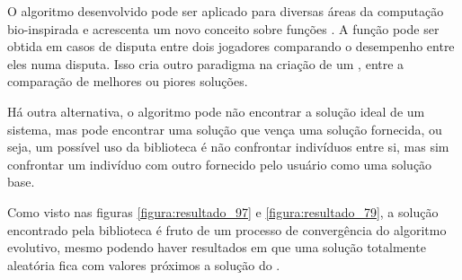 O algoritmo desenvolvido pode ser aplicado para diversas áreas da computação bio-inspirada e acrescenta um novo conceito sobre funções \fitness. A função \fitness pode ser obtida em casos de disputa entre dois jogadores comparando o desempenho entre eles numa disputa. Isso cria outro paradigma na criação de um \SE, entre a comparação de melhores ou piores soluções.

Há outra alternativa, o algoritmo pode não encontrar a solução ideal de um sistema, mas pode encontrar uma solução que vença uma solução fornecida, ou seja, um possível uso da biblioteca é não confrontar indivíduos entre si, mas sim confrontar um indivíduo com outro fornecido pelo usuário como uma solução base.

Como visto nas figuras \ref{figura:resultado_97} e \ref{figura:resultado_79}, a solução encontrado pela biblioteca é fruto de um processo de convergência do algoritmo evolutivo, mesmo podendo haver resultados em que uma solução totalmente aleatória fica com valores próximos a solução do \SE.